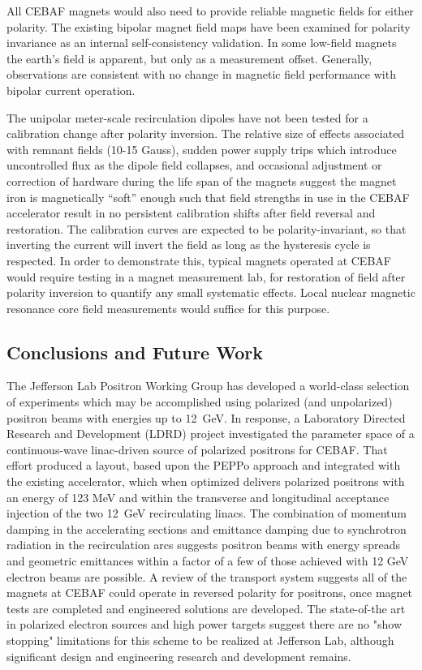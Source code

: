 All CEBAF magnets would also need to provide reliable magnetic fields for either polarity.  The existing bipolar magnet field maps have been examined for polarity invariance as an internal self-consistency validation. In some low-field magnets the earth’s field is apparent, but only as a measurement offset. Generally, observations are consistent with no change in magnetic field performance with bipolar current operation.

The unipolar meter-scale recirculation dipoles have not been tested for a calibration change after polarity inversion. The relative size of effects associated with remnant fields (10-15 Gauss), sudden power supply trips which introduce uncontrolled flux as the dipole field collapses, and occasional adjustment or correction of hardware during the life span of the magnets suggest the magnet iron is magnetically “soft” enough such that field strengths in use in the CEBAF accelerator result in no persistent calibration shifts after field reversal and restoration.  The calibration curves are expected to be polarity-invariant, so that inverting the current will invert the field as long as the hysteresis cycle is respected.  In order to demonstrate this, typical magnets operated at CEBAF would require testing in a magnet measurement lab, for restoration of field after polarity inversion to quantify any small systematic effects.  Local nuclear magnetic resonance core field measurements would suffice for this purpose.

\subsection{Conclusions and Future Work}

The Jefferson Lab Positron Working Group has developed a world-class selection of experiments which may be accomplished using polarized (and unpolarized) positron beams with energies up to 12~GeV.  In response, a Laboratory Directed Research and Development (LDRD) project investigated the parameter space of a continuous-wave linac-driven source of polarized positrons for CEBAF.  That effort produced a layout, based upon the PEPPo approach and integrated with the existing accelerator, which when optimized delivers polarized positrons with an energy of 123 MeV and within the transverse and longitudinal acceptance injection of the two 12~GeV recirculating linacs.  The combination of momentum damping in the accelerating sections and emittance damping due to synchrotron radiation in the recirculation arcs suggests positron beams with energy spreads and geometric emittances within a factor of a few of those achieved with 12 GeV electron beams are possible.  A  review of the transport system suggests all of the magnets at CEBAF could operate in reversed polarity for positrons, once magnet tests are completed and engineered solutions are developed.  The state-of-the art in polarized electron sources and high power targets suggest there are no "show stopping" limitations for this scheme to be realized at Jefferson Lab, although significant design and engineering research and development remains. 


